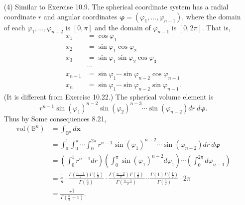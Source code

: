 \documentclass{article}
\begin{document}
\begin{enumerate}
\item[(4)]
  Similar to Exercise 10.9.
  The spherical coordinate system has a radial coordinate $r$ and
  angular coordinates $\bm{\varphi} = (\varphi_1, \ldots, \varphi_{n-1})$,
  where the domain of each $\varphi_1, \ldots, \varphi_{n-2}$ is $[0,\pi]$
  and the domain of $\varphi_{n-1}$ is $[0,2\pi]$.
  That is,
  \begin{align*}
    x_1 &= \cos\varphi_1 \\
    x_2 &= \sin\varphi_1 \cos\varphi_2 \\
    x_3 &= \sin\varphi_1 \sin\varphi_2 \cos\varphi_3 \\
    & \cdots \\
    x_{n-1} &= \sin\varphi_1 \cdots \sin\varphi_{n-2} \cos\varphi_{n-1} \\
    x_n &= \sin\varphi_1 \cdots \sin\varphi_{n-2} \sin\varphi_{n-1}.
  \end{align*}
  (It is different from Exercise 10.22.)
  The spherical volume element is
  \[
    r^{n-1} \sin(\varphi_1)^{n-2} \sin(\varphi_2)^{n-3} \cdots \sin(\varphi_{n-2})
    dr \: d\bm{\varphi}.
  \]
  Thus by Some consequences 8.21,
  \begin{align*}
    \mathrm{vol}(\mathbb{B}^n)
    &= \int_{\mathbb{B}^{n}} d\mathbf{x} \\
    &= \int_{0}^{1} \int_{0}^{\pi} \cdots \int_{0}^{2\pi}
      r^{n-1} \sin(\varphi_1)^{n-2} \cdots \sin(\varphi_{n-2})
      dr \: d\bm{\varphi} \\
    &= \left( \int_{0}^{1} r^{n-1} dr \right)
      \left(\int_{0}^{\pi} \sin(\varphi_1)^{n-2} d\varphi_1 \right)
      \cdots
      \left(\int_{0}^{2\pi} d\varphi_{n-1} \right) \\
    &= \frac{1}{n}
      \cdot \frac{\Gamma(\frac{n-1}{2})\Gamma(\frac{1}{2})}{\Gamma(\frac{n}{2})}
      \cdot \frac{\Gamma(\frac{n-2}{2})\Gamma(\frac{1}{2})}{\Gamma(\frac{n-1}{2})}
      \cdots
      \frac{\Gamma(1)\Gamma(\frac{1}{2})}{\Gamma(\frac{3}{2})} \cdot 2\pi \\
    &= \frac{\pi^{\frac{n}{2}}}{\Gamma\left(\frac{n}{2}+1\right)}.
  \end{align*}


\end{enumerate}
\end{document}
